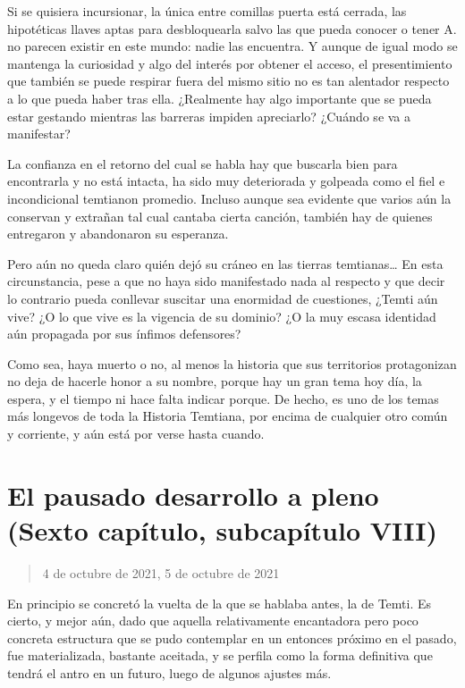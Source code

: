 \documentclass[
  spanish,
]{book}
\begin{document}
Si se quisiera incursionar, la única entre comillas puerta está cerrada, las hipotéticas llaves aptas para desbloquearla salvo las que pueda conocer o tener A. no parecen existir en este mundo: nadie las encuentra. Y aunque de igual modo se mantenga la curiosidad y algo del interés por obtener el acceso, el presentimiento que también se puede respirar fuera del mismo sitio no es tan alentador respecto a lo que pueda haber tras ella. ¿Realmente hay algo importante que se pueda estar gestando mientras las barreras impiden apreciarlo? ¿Cuándo se va a manifestar?

La confianza en el retorno del cual se habla hay que buscarla bien para encontrarla y no está intacta, ha sido muy deteriorada y golpeada como el fiel e incondicional temtianon promedio. Incluso aunque sea evidente que varios aún la conservan y extrañan tal cual cantaba cierta canción, también hay de quienes entregaron y abandonaron su esperanza.

Pero aún no queda claro quién dejó su cráneo en las tierras temtianas\ldots{} En esta circunstancia, pese a que no haya sido manifestado nada al respecto y que decir lo contrario pueda conllevar suscitar una enormidad de cuestiones, ¿Temti aún vive? ¿O lo que vive es la vigencia de su dominio? ¿O la muy escasa identidad aún propagada por sus ínfimos defensores?

Como sea, haya muerto o no, al menos la historia que sus territorios protagonizan no deja de hacerle honor a su nombre, porque hay un gran tema hoy día, la espera, y el tiempo ni hace falta indicar porque. De hecho, es uno de los temas más longevos de toda la Historia Temtiana, por encima de cualquier otro común y corriente, y aún está por verse hasta cuando.

\hypertarget{el-pausado-desarrollo-a-pleno-sexto-capuxedtulo-subcapuxedtulo-viii}{%
\section{El pausado desarrollo a pleno (Sexto capítulo, subcapítulo VIII)}\label{el-pausado-desarrollo-a-pleno-sexto-capuxedtulo-subcapuxedtulo-viii}}

\begin{quote}
4 de octubre de 2021, 5 de octubre de 2021
\end{quote}

En principio se concretó la vuelta de la que se hablaba antes, la de Temti. Es cierto, y mejor aún, dado que aquella relativamente encantadora pero poco concreta estructura que se pudo contemplar en un entonces próximo en el pasado, fue materializada, bastante aceitada, y se perfila como la forma definitiva que tendrá el antro en un futuro, luego de algunos ajustes más.
\end{document}

